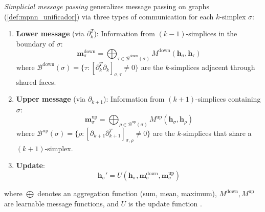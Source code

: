 \begin{definition}\label{def:mensaje_simplicial_gdl}
	\textit{Simplicial message passing} generalizes message passing on graphs (\autoref{def:mpnn_unificador}) via three types of communication for each $k$-simplex $\sigma$:
	\begin{enumerate}
		\item \textbf{Lower message} (via $\partial_k^T$): Information from $(k{-}1)$-simplices in the boundary of $\sigma$:
		\[
			\mathbf{m}_\sigma^{\mathrm{down}} = \bigoplus_{\tau \in \mathcal{B}^{\mathrm{down}}(\sigma)} M^{\mathrm{down}}\!\left(\mathbf{h}_\sigma, \mathbf{h}_\tau\right)
		\]
		where $\mathcal{B}^{\mathrm{down}}(\sigma) = \{\tau : [\partial_k^T \partial_k]_{\sigma,\tau} \neq 0\}$ are the $k$-simplices adjacent through shared faces.

		\item \textbf{Upper message} (via $\partial_{k+1}$): Information from $(k{+}1)$-simplices containing $\sigma$:
		\[
			\mathbf{m}_\sigma^{\mathrm{up}} = \bigoplus_{\rho \in \mathcal{B}^{\mathrm{up}}(\sigma)} M^{\mathrm{up}}\!\left(\mathbf{h}_\sigma, \mathbf{h}_\rho\right)
		\]
		where $\mathcal{B}^{\mathrm{up}}(\sigma) = \{\rho : [\partial_{k+1} \partial_{k+1}^T]_{\sigma,\rho} \neq 0\}$ are the $k$-simplices that share a $(k{+}1)$-simplex.

		\item \textbf{Update}:
		\[
			\mathbf{h}_\sigma' = U\!\left(\mathbf{h}_\sigma, \mathbf{m}_\sigma^{\mathrm{down}}, \mathbf{m}_\sigma^{\mathrm{up}}\right)
		\]
	\end{enumerate}
	where $\bigoplus$ denotes an aggregation function (sum, mean, maximum), $M^{\mathrm{down}}, M^{\mathrm{up}}$ are learnable message functions, and $U$ is the update function \citep{bodnar2021weisfeiler}.
\end{definition}

